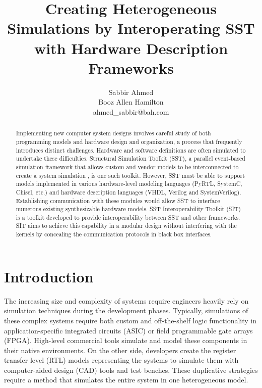 \documentclass{article}
\title{Creating Heterogeneous Simulations by Interoperating SST with Hardware Description Frameworks}
\author{
  Sabbir Ahmed \\
  Booz Allen Hamilton \\
  ahmed\_sabbir@bah.com
}
\begin{document}
  \maketitle

  \begin{abstract}
    Implementing new computer system designs involves careful study of both programming models and
    hardware design and organization, a process that frequently introduces distinct challenges.
    Hardware and software definitions are often simulated to undertake these difficulties.
    Structural Simulation Toolkit (SST), a parallel event-based simulation framework that allows
    custom and vendor models to be interconnected to create a system simulation \cite{sst}, is one
    such toolkit. However, SST must be able to support models implemented in various hardware-level
    modeling languages (PyRTL, SystemC, Chisel, etc.) and hardware description languages (VHDL,
    Verilog and SystemVerilog). Establishing communication with these modules would allow SST to
    interface numerous existing synthesizable hardware models. SST Interoperability Toolkit (SIT) is a toolkit
    developed to provide interoperability between SST and other frameworks. SIT aims to achieve
    this capability in a modular design without interfering with the kernels by concealing the
    communication protocols in black box interfaces. 
  \end{abstract}

  \section{Introduction}  
  The increasing size and complexity of systems require engineers heavily rely on simulation
  techniques during the development phases. Typically, simulations of these complex systems require
  both custom and off-the-shelf logic functionality in application-specific integrated circuits
  (ASIC) or field programmable gate arrays (FPGA). High-level commercial tools simulate and model
  these components in their native environments. On the other side, developers create the register
  transfer level (RTL) models representing the systems to simulate them with computer-aided design
  (CAD) tools and test benches. These duplicative strategies require a method that simulates the
  entire system in one heterogeneous model.
\end{document}
